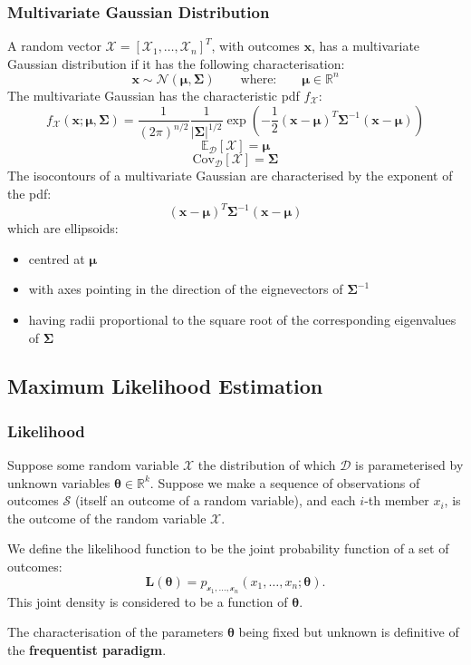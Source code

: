\subsubsection{Multivariate Gaussian Distribution}
A random vector $\boldsymbol{\mathcal{X}} =
{[\mathcal{X}_1,\ldots,\mathcal{X}_n]}^T$, with outcomes $\mathbf{x}$, has a
multivariate Gaussian distribution if it has the following characterisation:
\[\mathbf{x} \sim \mathcal{N}(\boldsymbol{\mu},\boldsymbol{\Sigma}) \qquad \text{where:} \qquad \boldsymbol{\mu} \in \mathbb{R}^n\]
The multivariate Gaussian has the characteristic pdf
$f_{\boldsymbol{\mathcal{X}}}$:
\[f_{\boldsymbol{\mathcal{X}}}(\mathbf{x} ; \boldsymbol{\mu},\boldsymbol{\Sigma}) = \frac{1}{{(2 \pi)}^{n/2}} \frac{1}{\vert \boldsymbol{\Sigma} \vert^{1/2}} \exp \left( -\frac{1}{2}{(\mathbf{x}-\boldsymbol{\mu})}^T \boldsymbol{\Sigma}^{-1} (\mathbf{x}-\boldsymbol{\mu}) \right)\]
\[\mathbb{E}_{\mathcal{D}}[\boldsymbol{\mathcal{X}}] = \boldsymbol{\mu}\]
\[\text{Cov}_{\mathcal{D}}[\boldsymbol{\mathcal{X}}] = \boldsymbol{\Sigma}\]
The isocontours of a multivariate Gaussian are characterised by the exponent of the pdf:
\[{(\mathbf{x}-\boldsymbol{\mu})}^T {\boldsymbol{\Sigma}}^{-1} (\mathbf{x}-\boldsymbol{\mu})\]
which are ellipsoids:
\begin{itemize}
  \item centred at $\boldsymbol{\mu}$
  \item with axes pointing in the direction of the eignevectors of $\boldsymbol{\Sigma}^{-1}$
  \item having radii proportional to the square root of the corresponding eigenvalues of $\boldsymbol{\Sigma}$
\end{itemize}

\subsection{Maximum Likelihood Estimation}
\subsubsection{Likelihood}
Suppose some random variable $\mathcal{X}$ the distribution of which
$\mathcal{D}$ is parameterised by unknown variables  $\mathbf{\theta}\in
\mathbb{R}^{k}$. Suppose we make a sequence of observations of outcomes
$\mathcal{S}$ (itself an outcome of a random variable), and each $i$-th member
$x_i$, is the outcome of the random variable $\mathcal{X}$.
\begin{definition}
  We define the likelihood function to be the joint probability function of a
  set of outcomes:
\[\mathbf{L}(\boldsymbol{\theta})=p_{\mathcal{x}_1,\ldots,\mathcal{x}_{n}}(x_1,\ldots,x_{n};\boldsymbol{\theta}).\] 
  This joint density is considered to be a function of $\boldsymbol{\theta}$.
\end{definition}
\begin{remark}
  The characterisation of the parameters $\mathbf{\theta}$ being fixed but
  unknown is definitive of the \textbf{frequentist paradigm}.
\end{remark}
